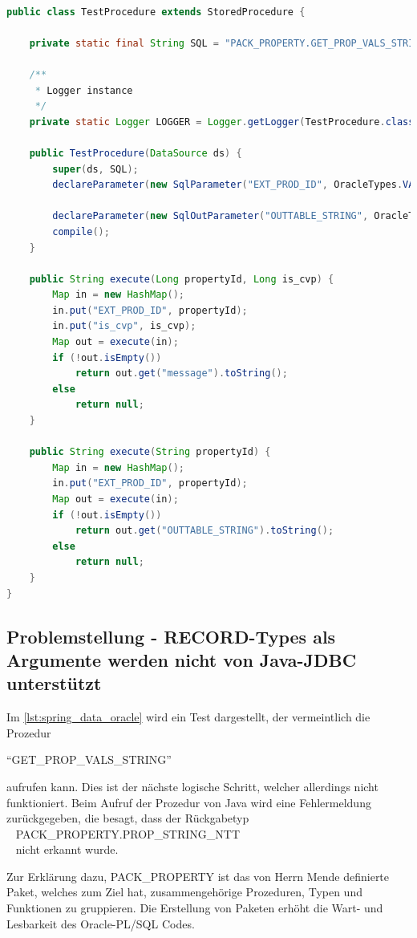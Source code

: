 \begin{lstlisting}[caption=Spring Data Oracle - Aufruf der Prozeduren mit Rückgabetabellen, language=java, label=lst:spring_data_oracle]

public class TestProcedure extends StoredProcedure {

    private static final String SQL = "PACK_PROPERTY.GET_PROP_VALS_STRING";

    /**
     * Logger instance
     */
    private static Logger LOGGER = Logger.getLogger(TestProcedure.class);

	public TestProcedure(DataSource ds) {
		super(ds, SQL);
		declareParameter(new SqlParameter("EXT_PROD_ID", OracleTypes.VARCHAR));

		declareParameter(new SqlOutParameter("OUTTABLE_STRING", OracleTypes.STRUCT, "PACK_PROPERTY.PROP_STRING_NTT", new SqlReturnSqlData(PropStringNtt.class)));
		compile();
	}

	public String execute(Long propertyId, Long is_cvp) {
		Map in = new HashMap();
		in.put("EXT_PROD_ID", propertyId);
        in.put("is_cvp", is_cvp);
		Map out = execute(in);
		if (!out.isEmpty())
			return out.get("message").toString();
		else
			return null;
	}

    public String execute(String propertyId) {
		Map in = new HashMap();
		in.put("EXT_PROD_ID", propertyId);
		Map out = execute(in);
		if (!out.isEmpty())
			return out.get("OUTTABLE_STRING").toString();
		else
			return null;
	}
}
\end{lstlisting}

\subsection{Problemstellung - RECORD-Types als Argumente werden nicht von Java-JDBC unterstützt}

Im \autoref{lst:spring_data_oracle} wird ein Test dargestellt, der vermeintlich die Prozedur 

\enquote{GET\_PROP\_VALS\_STRING} 

aufrufen kann. Dies ist der nächste logische Schritt, welcher allerdings nicht funktioniert. Beim Aufruf der Prozedur von Java wird eine Fehlermeldung zurückgegeben, die besagt, dass der Rückgabetyp \\~ 
PACK\_PROPERTY.PROP\_STRING\_NTT \\~ 
nicht erkannt wurde. 

Zur Erklärung dazu, PACK\_PROPERTY ist das von Herrn Mende definierte Paket, welches zum Ziel hat, zusammengehörige Prozeduren, Typen und Funktionen zu gruppieren. Die Erstellung von Paketen erhöht die Wart- und Lesbarkeit des Oracle-PL/SQL Codes. 

